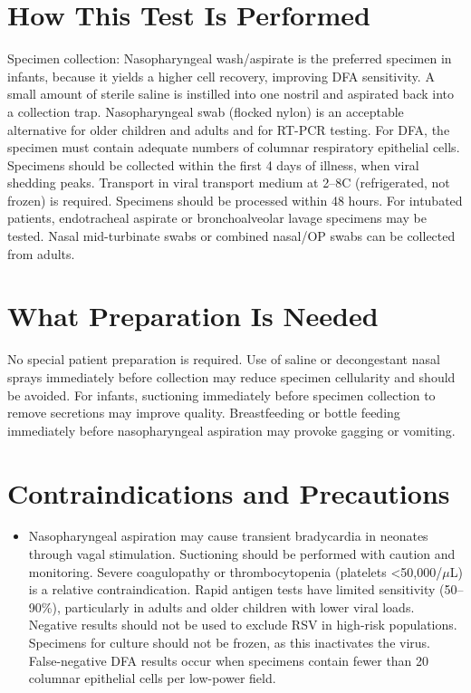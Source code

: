 \section*{How This Test Is Performed}
Specimen collection: Nasopharyngeal wash/aspirate is the preferred specimen in infants, because it yields a higher cell recovery, improving DFA sensitivity. A small amount of sterile saline is instilled into one nostril and aspirated back into a collection trap. Nasopharyngeal swab (flocked nylon) is an acceptable alternative for older children and adults and for RT-PCR testing. For DFA, the specimen must contain adequate numbers of columnar respiratory epithelial cells. Specimens should be collected within the first 4 days of illness, when viral shedding peaks. Transport in viral transport medium at 2--8\textdegree{}C (refrigerated, not frozen) is required. Specimens should be processed within 48 hours. For intubated patients, endotracheal aspirate or bronchoalveolar lavage specimens may be tested. Nasal mid-turbinate swabs or combined nasal/OP swabs can be collected from adults.

\section*{What Preparation Is Needed}
No special patient preparation is required. Use of saline or decongestant nasal sprays immediately before collection may reduce specimen cellularity and should be avoided. For infants, suctioning immediately before specimen collection to remove secretions may improve quality. Breastfeeding or bottle feeding immediately before nasopharyngeal aspiration may provoke gagging or vomiting.

\section*{Contraindications and Precautions}
\begin{itemize}
  \item Nasopharyngeal aspiration may cause transient bradycardia in neonates through vagal stimulation. Suctioning should be performed with caution and monitoring. Severe coagulopathy or thrombocytopenia (platelets <50,000/$\mu$L) is a relative contraindication. Rapid antigen tests have limited sensitivity (50--90\%), particularly in adults and older children with lower viral loads. Negative results should not be used to exclude RSV in high-risk populations. Specimens for culture should not be frozen, as this inactivates the virus. False-negative DFA results occur when specimens contain fewer than 20 columnar epithelial cells per low-power field.
\end{itemize}
